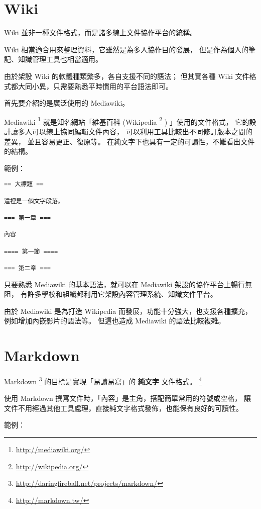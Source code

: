 \documentclass[a4paper,12pt,english]{sphinxmanual}
\begin{document}
\section{Wiki}
\label{syntax:wiki}
Wiki 並非一種文件格式，而是諸多線上文件協作平台的統稱。

Wiki 相當適合用來整理資料，它雖然是為多人協作目的發展，
但是作為個人的筆記、知識管理工具也相當適用。

由於架設 Wiki 的軟體種類繁多，各自支援不同的語法；
但其實各種 Wiki 文件格式都大同小異，只需要熟悉平時慣用的平台語法即可。

首先要介紹的是廣泛使用的 Mediawiki。

Mediawiki \footnote{
\href{http://mediawiki.org/}{http://mediawiki.org/}
} 就是知名網站「維基百科 (Wikipedia \footnote{
\href{http://wikipedia.org/}{http://wikipedia.org/}
} ) 」使用的文件格式，
它的設計讓多人可以線上協同編輯文件內容，
可以利用工具比較出不同修訂版本之間的差異，
並且容易更正、復原等。
在純文字下也具有一定的可讀性，不難看出文件的結構。

範例：

\begin{Verbatim}[commandchars=@\[\]]
== 大標題 ==

這裡是一個文字段落。

=== 第一章 ===

內容

==== 第一節 ====

=== 第二章 ===
\end{Verbatim}

只要熟悉 Mediawiki 的基本語法，就可以在 Mediawiki 架設的協作平台上暢行無阻，
有許多學校和組織都利用它架設內容管理系統、知識文件平台。

由於 Mediawiki 是為打造 Wikipedia 而發展，功能十分強大，也支援各種擴充，例如增加內嵌影片的語法等。
但這也造成 Mediawiki 的語法比較複雜。


\section{Markdown}
\label{syntax:markdown}
Markdown \footnote{
\href{http://daringfireball.net/projects/markdown/}{http://daringfireball.net/projects/markdown/}
} 的目標是實現「易讀易寫」的 \textbf{純文字} 文件格式。 \footnote{
\href{http://markdown.tw/}{http://markdown.tw/}
}

使用 Markdown 撰寫文件時，「內容」是主角，搭配簡單常用的符號或空格，
讓文件不用經過其他工具處理，直接純文字格式發佈，也能保有良好的可讀性。

範例：
\end{document}
